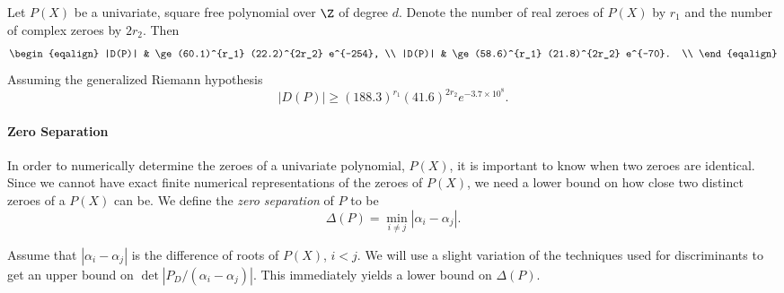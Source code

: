 \begin{proposition}
Let $P(X)$ be a univariate, square free polynomial over $\Z$ of degree
$d$.  Denote the number of real zeroes of $P(X)$ by $r_1$ and the
number of complex zeroes by $2r_2$.  Then
\[
\begin{eqalign}
|D(P)| & \ge (60.1)^{r_1} (22.2)^{2r_2} e^{-254}, \\
|D(P)| & \ge (58.6)^{r_1} (21.8)^{2r_2} e^{-70}. \\
\end{eqalign}
\]
Assuming the generalized Riemann hypothesis
\[
|D(P)| \ge (188.3)^{r_1} (41.6)^{2r_2} e^{-3.7\times10^8}.
\]
\end{proposition}


\paragraph{Zero Separation}

In order to numerically determine the zeroes of a univariate
polynomial, $P(X)$, it is important to know when two zeroes are
identical.  Since we cannot have exact finite numerical
representations of the zeroes of $P(X)$, we need a lower bound on how
close two distinct zeroes of a $P(X)$ can be.  We define the {\em zero
separation} of $P$ to be
\[
\Delta(P) = \min_{i \not= j} \left| \alpha_{i} - \alpha_{j} \right|.
\]

Assume that $|\alpha_i - \alpha_j|$ is the difference of roots of
$P(X)$, $i < j$.  We will use a slight variation of the techniques
used for discriminants to get an upper bound on $\det|P_D/(\alpha_i -
\alpha_j)|$.  This immediately yields a lower bound on $\Delta(P)$. 

